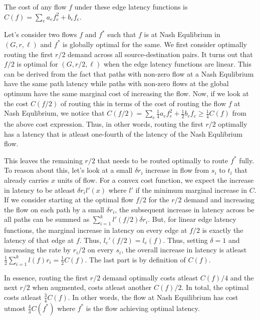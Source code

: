 \begin{proof-sketch}
    The cost of any flow $f$ under these edge latency functions is $C(f) = \displaystyle \sum_e a_ef^2_e + b_ef_e$.

    Let's consider two flows $f$ and $f^*$ such that $f$ is at Nash Equlibrium in $(G, r, \ell)$ and $f^*$ is globally optimal for the same. We first consider optimally routing the first $r/2$ demand 
    across all source-destination pairs. It turns out that $f/2$ is optimal for $(G, r/2,\ell)$ when the edge latency functions are linear. This can be derived from the fact that paths with
    non-zero flow at a Nash Equlibrium have the same path latency while paths with non-zero flows at the global optimum have the same marginal cost of increasing the flow. Now, if we look at the cost
    $C(f/2)$ of routing this in terms of the cost of routing the flow $f$ at Nash Equlibrium, we notice that $C(f/2) = \displaystyle \sum_e \frac{1}{4}a_ef^2_e + \frac{1}{2}b_ef_e \geq \frac{1}{4}C(f)$
    from the above cost expression. Thus, in other words, routing the first $r/2$ optimally has a latency that is atleast one-fourth of the latency of the Nash Equlibrium flow.

    This leaves the remaining $r/2$ that needs to be routed optimally to route $f^*$ fully. To reason about this, let's look at a small $\delta r_i$ increase in flow from $s_i$ to $t_i$ that already carries $x$ units 
    of flow. For a convex cost function, we expect the increase in latency to be atleast $\delta r_il'(x)$ where $l'$ if the minimum marginal increase in $C$. If we consider starting at the 
    optimal flow $f/2$ for the $r/2$ demand and increasing the flow on each path by a small $\delta r_i$, the subsequent increase in 
    latency across be all paths can be summed as  $\displaystyle \sum_{i = 1}^kl'(f/2)\delta r_i$. But, for linear edge latency functions, the marginal increase in latency on every edge at $f/2$ is exactly
    the latency of that edge at $f$. Thus, $l_e'(f/2) = l_e(f)$. Thus, setting $\delta = 1$ and increasing the rate by $r_i/2$ on every $s_i$, the overall increase in latency is  atleast $\displaystyle \frac{1}{2}\sum_{i= 1}^kl(f)r_i
    = \frac{1}{2}C(f)$. The last part is by definition of $C(f)$. 
    
    In essence, routing the first $r/2$ demand optimally costs atleast $C(f)/4$ and the next $r/2$ when augmented, costs atleast another $C(f)/2$. In total, the optimal costs atleast $\frac{3}{4}C(f)$. In other words,
    the flow at Nash Equilibrium has cost utmost $\frac{4}{3}C(f^*)$ where $f^*$ is the flow achieving optimal latency.
\end{proof-sketch}
